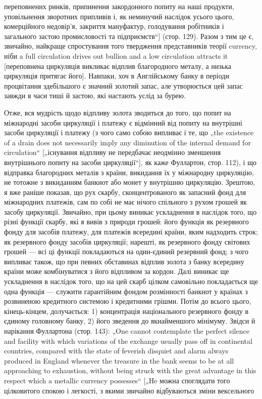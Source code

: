 \parcont{}  %
переповнених ринків, припинення закордонного попиту на наші
продукти, уповільнення зворотних припливів і, як неминучий
наслідок усього цього, комерційного недовір’я, закриття мануфактур,
голодування робітників і загального застою промисловості
та підприємств“] (стор. 129). Разом з тим це є, звичайно,
найкраще спростування того твердження представників теорії
currency, ніби a full circulation drives out bullion and a low circulation
attracts it [переповнена циркуляція викликає відплив благородного
металу, а низька циркуляція притягає його]. Навпаки,
хоч в Англійському банку в періоди процвітання здебільшого є
значний золотий запас, але утворюється цей запас завжди в часи
тиші й застою, які настають услід за бурею.

Отже, вся мудрість щодо відпливу золота зводиться до того,
що попит на міжнародні засоби циркуляції і платежу є відмінний
від попиту на внутрішні засоби циркуляції і платежу (з чого
само собою випливає і те, що „the existence of a drain does not
necessarily imply any diminution of the internal demand for circulation“
[„існування відпливу не передбачає неодмінно зменшення
внутрішнього попиту на засоби циркуляції“], як каже Фуллартон,
стор. 112), і що відправка благородних металів з країни,
викидання їх у міжнародну циркуляцію, не тотожне з викиданням
банкнот або монет у внутрішню циркуляцію. Зрештою,
я вже раніше показав, що рух скарбу, сконцентрованого як запасний
фонд для міжнародних платежів, сам по собі не має
нічого спільного з рухом грошей як засобу циркуляції. Звичайно,
при цьому виникає ускладнення в наслідок того, що різні функції
скарбу, які я вивів з природи грошей: його функція як резервного
фонду для засобів платежу, для платежів всередині
країни, яким надходить строк; як резервного фонду засобів циркуляції;
нарешті, як резервного фонду світових грошей — всі ці
функції покладаються на один-єдиний резервний фонд; з чого випливає
також, що при певних обставинах відплив золота з банку
всередину країни може комбінуватися з його відпливом за кордон.
Далі виникає ще ускладнення в наслідок того, що на цей скарб
цілком самовільно покладається ще одна функція — служити гарантійним
фондом розмінності банкнот у країнах з розвиненою
кредитного системою і кредитними грішми. Потім до всього
цього, кінець-кінцем, долучається: 1) концентрація національного
резервного фонду в єдиному головному банку, 2) його зведення
до якнайменшого мінімуму. Звідси й нарікання Фуллартона
(стор. 143): „One cannot contemplate the perfect silence and facility
with which variations of the exchange usually pass off in continental
countries, compared with the state of feverish disquiet and
alarm always produced in England whenever the treasure in the
bank seems to be at all approaching to exhaustion, without being
struck with the great advantage in this respect which a metallic currency
possesses“ [„He можна споглядати того цілковитого спокою
і легкості, з якими звичайно відбуваються зміни вексельного
\parbreak{}  %
